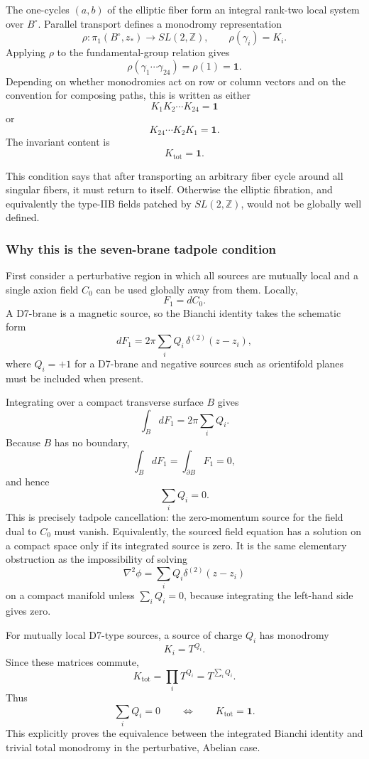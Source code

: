 \documentclass[
  10pt,
  a4paper,
  openany]{book}
\begin{document}
The one-cycles \((a,b)\) of the elliptic fiber form an integral rank-two
local system over \(B^\circ\). Parallel transport defines a monodromy
representation \[
\rho:\pi_1(B^\circ,z_*)\longrightarrow SL(2,\mathbb Z),
\qquad
\rho(\gamma_i)=K_i.
\] Applying \(\rho\) to the fundamental-group relation gives \[
\rho(\gamma_1\cdots\gamma_{24})
=\rho(1)
=\mathbf1.
\] Depending on whether monodromies act on row or column vectors and on
the convention for composing paths, this is written as either \[
K_1K_2\cdots K_{24}=\mathbf1
\] or \[
K_{24}\cdots K_2K_1=\mathbf1.
\] The invariant content is \[
\boxed{K_{\mathrm{tot}}=\mathbf1}.
\]

This condition says that after transporting an arbitrary fiber cycle
around all singular fibers, it must return to itself. Otherwise the
elliptic fibration, and equivalently the type-IIB fields patched by
\(SL(2,\mathbb Z)\), would not be globally well defined.

\subsubsection{Why this is the seven-brane tadpole
condition}\label{why-this-is-the-seven-brane-tadpole-condition}

First consider a perturbative region in which all sources are mutually
local and a single axion field \(C_0\) can be used globally away from
them. Locally, \[
F_1=dC_0.
\] A D7-brane is a magnetic source, so the Bianchi identity takes the
schematic form \[
dF_1
=2\pi\sum_i Q_i\,
\delta^{(2)}(z-z_i),
\] where \(Q_i=+1\) for a D7-brane and negative sources such as
orientifold planes must be included when present.

Integrating over a compact transverse surface \(B\) gives \[
\int_BdF_1
=2\pi\sum_iQ_i.
\] Because \(B\) has no boundary, \[
\int_BdF_1
=\int_{\partial B}F_1
=0,
\] and hence \[
\boxed{\sum_iQ_i=0}.
\] This is precisely tadpole cancellation: the zero-momentum source for
the field dual to \(C_0\) must vanish. Equivalently, the sourced field
equation has a solution on a compact space only if its integrated source
is zero. It is the same elementary obstruction as the impossibility of
solving \[
\nabla^2\phi=\sum_iQ_i\delta^{(2)}(z-z_i)
\] on a compact manifold unless \(\sum_iQ_i=0\), because integrating the
left-hand side gives zero.

For mutually local D7-type sources, a source of charge \(Q_i\) has
monodromy \[
K_i=T^{Q_i}.
\] Since these matrices commute, \[
K_{\mathrm{tot}}
=\prod_iT^{Q_i}
=T^{\sum_iQ_i}.
\] Thus \[
\sum_iQ_i=0
\qquad\Longleftrightarrow\qquad
K_{\mathrm{tot}}=\mathbf1.
\] This explicitly proves the equivalence between the integrated Bianchi
identity and trivial total monodromy in the perturbative, Abelian case.
\end{document}
